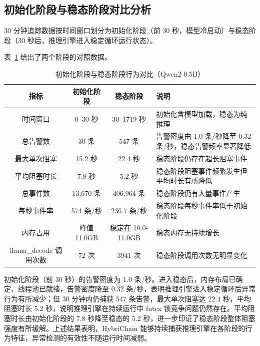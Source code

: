\subsection{初始化阶段与稳态阶段对比分析}

30 分钟追踪数据按时间窗口划分为初始化阶段（前 30 秒，模型冷启动）与稳态阶段（30 秒后，推理引擎进入稳定循环运行状态）。

表~\ref{tab:steady_state} 给出了两个阶段的对照数据。

\begin{table}[H]
    \centering
    \caption{初始化阶段与稳态阶段行为对比（Qwen2-0.5B）}
    \label{tab:steady_state}
    \begin{tabular}{|c|c|c|p{6cm}|}
        \hline
        \textbf{指标} & \textbf{初始化阶段} & \textbf{稳态阶段} & \textbf{说明} \\
        \hline
        时间窗口 & 0–30 秒 & 30–1719 秒 & 初始化含模型加载，稳态为纯推理 \\
        \hline
        总告警数 & 30 条 & 547 条 & 告警密度由 1.0 条/秒降至 0.32 条/秒，稳态告警频率显著降低 \\
        \hline
        最大单次阻塞 & 15.2 秒 & 22.4 秒 & 稳态阶段仍存在超长阻塞事件 \\
        \hline
        平均阻塞时长 & 7.8 秒 & 5.2 秒 & 稳态阶段阻塞事件频繁发生但平均时长有所降低 \\
        \hline
        总事件数 & 13,670 条 & 406,964 条 & 稳态阶段仍有大量事件产生 \\
        \hline
        每秒事件率 & 574 条/秒 & 236.7 条/秒 & 稳态阶段每秒事件率低于初始化阶段 \\
        \hline
        内存占用  & 峰值 11.0GB & 稳定在 10.0-11.0GB & 稳态内存无持续增长 \\
        \hline
        llama\_decode 调用次数 & 72 次 & 3941 次 & 稳态阶段调用次数无明显变化 \\
        \hline
    \end{tabular}
\end{table}

初始化阶段（前 30 秒）的告警密度为 1.0 条/秒。进入稳态后，内存布局已确定、线程池已就绪，告警密度降至 0.32 条/秒，表明推理引擎进入稳定循环后异常行为有所减少；但 30 分钟内仍捕获 547 条告警，最大单次阻塞达 22.4 秒，平均阻塞时长 5.2 秒，说明推理引擎在持续运行中 futex 锁竞争问题仍然存在。平均阻塞时长由初始化阶段的 7.8 秒降至稳态的 5.2 秒，进一步印证了稳态阶段整体阻塞强度有所缓解。上述结果表明，HybriChain 能够持续捕获推理引擎在各阶段的行为特征，异常检测的有效性不随运行时间减弱。

